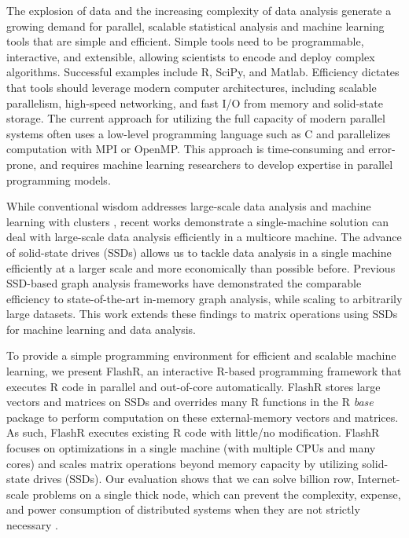 
The explosion of data and the increasing complexity of data analysis
generate a growing demand for parallel, scalable statistical analysis
and machine learning tools that are simple and efficient.
Simple tools need to be programmable, interactive, and extensible, 
allowing scientists to encode and deploy complex algorithms. 
Successful examples include R, SciPy, and Matlab.  Efficiency dictates that
tools should leverage modern computer architectures, including scalable
parallelism, high-speed networking, and fast I/O from memory and solid-state
storage. The current approach for utilizing the full
capacity of modern parallel systems often uses a low-level programming
language such as C and parallelizes computation with MPI or OpenMP.
This approach is time-consuming and error-prone, and requires machine learning
researchers to develop expertise in parallel programming models.
 

While conventional wisdom addresses large-scale data analysis and machine
learning with clusters
\cite{mapreduce,spark,systemml,tensorflow,petuum,graphlab}, recent works
\cite{flashgraph,gridgraph,Matveev17,hotos} demonstrate a single-machine
solution can deal with large-scale data analysis efficiently in a multicore
machine. The advance of solid-state drives (SSDs) allows us to tackle data
analysis in a single machine efficiently at a larger scale and more economically
than possible before. Previous SSD-based graph analysis frameworks
\cite{flashgraph, gridgraph, graphene}
have demonstrated the comparable efficiency to state-of-the-art in-memory graph
analysis, while scaling to arbitrarily large datasets. This work extends
these findings to matrix operations using SSDs for machine learning and
data analysis.


To provide a simple programming environment for efficient and scalable machine
learning, we present FlashR, an interactive R-based programming framework that
executes R code in parallel and out-of-core automatically. FlashR stores large
vectors and matrices on SSDs and overrides many R functions in the R
\textit{base} package to perform computation on these external-memory vectors
and matrices.
As such, FlashR executes existing R code with little/no modification.
FlashR focuses on optimizations in a single machine (with multiple CPUs and
many cores) and scales matrix operations beyond memory capacity by 
utilizing solid-state drives (SSDs).  
Our evaluation shows that we can solve billion row, Internet-scale 
problems on a single thick node, which can prevent the complexity,
expense, and power consumption of distributed systems when they are
not strictly necessary \cite{hotos}.

